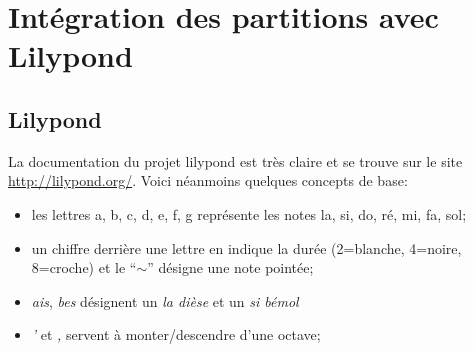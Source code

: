 \documentclass[a4paper]{article}
\begin{document}
%
%
%
%
%


\section{Intégration des partitions avec Lilypond}

\subsection{Lilypond}

La documentation du projet lilypond est très
claire et se trouve sur le site \url{http://lilypond.org/}.
Voici néanmoins quelques concepts de base:

\begin{itemize}
\item les lettres a, b, c, d, e, f, g représente les notes la, si, do,
  ré, mi, fa, sol;
\item un chiffre derrière une lettre en indique la durée (2=blanche, 4=noire,
  8=croche) et le ``$\sim$'' désigne une note pointée;
\item \emph{ais}, \emph{bes} désignent un \emph{la dièse} et un \emph{si bémol}
\item \emph{'} et \emph{,} servent à monter/descendre d'une octave;
\end{itemize}
\end{document}
